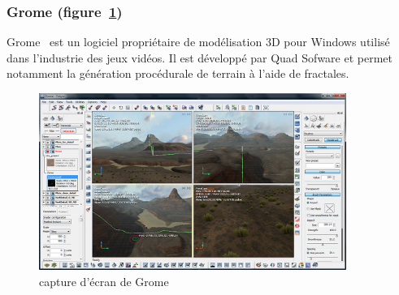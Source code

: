 \subsubsection{Grome (figure~\ref{fig:grome})}
Grome~\cite{Grome} est un logiciel propriétaire de modélisation 3D pour Windows utilisé dans l'industrie des jeux vidéos. Il est développé par Quad Sofware et permet
notamment la génération procédurale de terrain à l'aide de fractales.
\begin{figure}[!ht]
    \begin{center}
        \includegraphics[width=10cm]{resources/grome.jpg}
        \caption{capture d'écran de Grome}
        \label{fig:grome}
    \end{center}
\end{figure}
